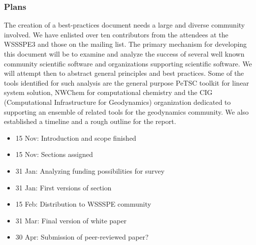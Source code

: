 \subsubsection{Plans}
The creation of a best-practices document needs a large and diverse community involved. We have enlisted over ten contributors from the attendees at the WSSSPE3 and 
those on the mailing list.
The primary mechanism for developing this document will be to examine and analyze the success of several well known community scientific
software and organizations supporting scientific software.
We will attempt then to abstract general principles and best practices.
Some of the tools identified for such analysis are
the general purpose PeTSC toolkit for linear system solution, NWChem for computational chemistry and the CIG (Computational Infrastructure for Geodynamics) organization dedicated to supporting an ensemble of related tools for the geodynamics community. 
We also established a timeline and a rough outline for the report.

\begin{itemize}
%
\item 15 Nov: Introduction and scope finished
\item 15 Nov: Sections assigned
\item 31 Jan: Analyzing funding possibilities for survey
\item 31 Jan: First versions of section
\item 15 Feb: Distribution to WSSSPE community
\item 31 Mar: Final version of white paper
\item 30 Apr: Submission of peer-reviewed paper?
\end{itemize}


